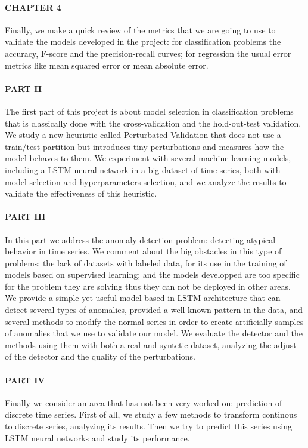 \paragraph{CHAPTER 4} Finally, we make a quick review of the metrics that we are going to use to validate the models developed in the project: for classification problems the accuracy, F-score and the precision-recall curves; for regression the usual error metrics like mean squared error or mean absolute error.

\paragraph{PART II} The first part of this project is about model selection in classification problems that is classically done with the cross-validation and the hold-out-test validation. We study a new heuristic called Perturbated Validation that does not use a train/test partition but introduces tiny perturbations and measures how the model behaves to them. We experiment with several machine learning models, including a LSTM neural network in a big dataset of time series, both with model selection and hyperparameters selection, and we analyze the results to validate the effectiveness of this heuristic.

\paragraph{PART III} In this part we address the anomaly detection problem: detecting atypical behavior in time series.
We comment about the big obstacles in this type of problems: the lack of datasets with labeled data, for its use in the training of models based on supervised learning; and the models developped are too specific for the problem they are solving thus they can not be deployed in other areas. We provide a simple yet useful model based in LSTM architecture that can detect several types of anomalies, provided a well known pattern in the data, and several methods to modify the normal series in order to create artificially samples of anomalies that we use to validate our model. We evaluate the detector and the methods using them with both a real and syntetic dataset, analyzing the adjust of the detector and the quality of the perturbations.

\paragraph{PART IV} Finally we consider an area that has not been very worked on: prediction of discrete time series. First of all, we study a few methods to transform continous to discrete series, analyzing its results. Then we try to predict this series using LSTM neural networks and study its performance.

